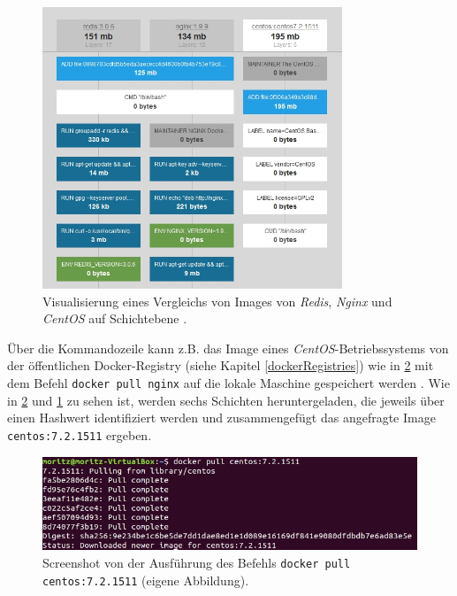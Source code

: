 \documentclass[../main.tex]{subfiles}
\begin{document}
			\begin{figure}[!htbp]
          \centering
          \includegraphics[width=0.8\textwidth]{./images/intro_imagelayers.jpg}
          \caption{Visualisierung eines Vergleichs von Images von \emph{Redis}, \emph{Nginx} und \emph{CentOS} auf Schichtebene \cite{dockerImagelayers}.}
          \label{fig:intro_imagelayers}
      \end{figure}


      Über die Kommandozeile kann z.B. das Image eines \emph{CentOS}-Betriebssystems von der öffentlichen Docker-Registry (siehe Kapitel \ref{dockerRegistries}) wie in \fig \ref{fig:intro_dockerPull} mit dem Befehl \texttt{docker pull nginx} auf die lokale Maschine gespeichert werden \cite{dockerHubNginx}\cite{dockerPull}. Wie in \fig \ref{fig:intro_dockerPull} und \fig \ref{fig:intro_imagelayers} zu sehen ist, werden sechs Schichten heruntergeladen, die jeweils über einen Hashwert identifiziert werden und zusammengefügt das angefragte Image \texttt{centos:7.2.1511} ergeben.

			\begin{figure}[!htbp]
          \centering
          \includegraphics[width=1.0\textwidth]{./images/intro_dockerPull.jpg}
          \caption{Screenshot von der Ausführung des Befehls \texttt{docker pull centos:7.2.1511} (eigene Abbildung).}
          \label{fig:intro_dockerPull}
      \end{figure}
\end{document}
